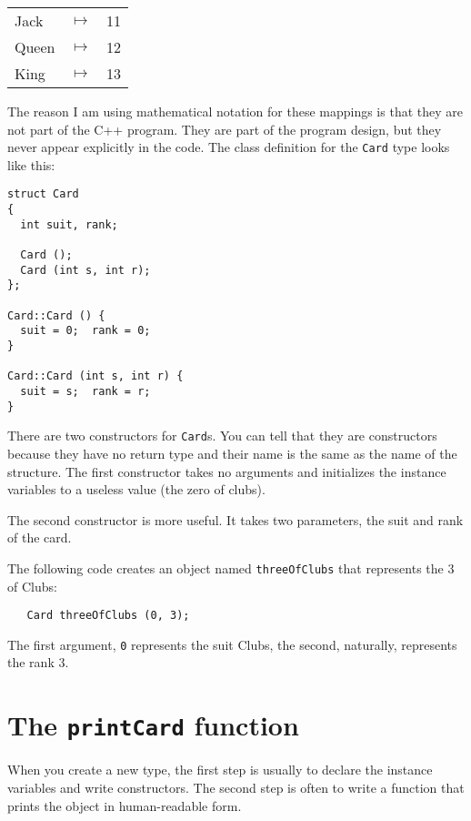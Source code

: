 \vspace{0.1in}
\begin{tabular}{l c l}
Jack & $\mapsto$ & 11 \\
Queen & $\mapsto$ & 12 \\
King & $\mapsto$ & 13 \\
\end{tabular}
\vspace{0.1in}

The reason I am using mathematical notation for these mappings is
that they are not part of the C++ program.  They are part of the
program design, but they never appear explicitly in the code.
The class definition for the {\tt Card} type looks like this:

\begin{lstlisting}
struct Card
{
  int suit, rank;

  Card ();
  Card (int s, int r);
};

Card::Card () { 
  suit = 0;  rank = 0;
}

Card::Card (int s, int r) { 
  suit = s;  rank = r;
}
\end{lstlisting}
%
There are two constructors for {\tt Card}s.  You can tell that
they are constructors because they have no return type and their
name is the same as the name of the structure.  The first
constructor takes no arguments and initializes the instance
variables to a useless value (the zero of clubs).

The second constructor is more useful.  It takes two parameters,
the suit and rank of the card.


The following code creates an object named {\tt threeOfClubs}
that represents
the 3 of Clubs:

\begin{lstlisting}
   Card threeOfClubs (0, 3);
\end{lstlisting}
%
The first argument, {\tt 0} represents the suit Clubs, the
second, naturally, represents the rank 3.

\section{The {\tt printCard} function}

When you create a new type, the first step is usually to declare the
instance variables and write constructors.  The second step is often
to write a function that prints the object in human-readable form.

